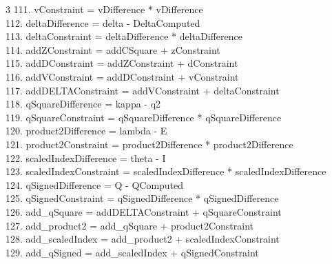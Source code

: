 \documentclass[10pt]{article}
\begin{document}
\begin{multicols}{3}
111. vConstraint = vDifference * vDifference\\
112. deltaDifference = delta - DeltaComputed\\
113. deltaConstraint = deltaDifference * deltaDifference\\
114. addZConstraint = addCSquare + zConstraint\\
115. addDConstraint = addZConstraint + dConstraint\\
116. addVConstraint = addDConstraint + vConstraint\\
117. addDELTAConstraint = addVConstraint + deltaConstraint\\
118. qSquareDifference = kappa - q2\\
119. qSquareConstraint = qSquareDifference * qSquareDifference\\
120. product2Difference = lambda - E\\
121. product2Constraint = product2Difference * product2Difference\\
122. scaledIndexDifference = theta - I\\
123. scaledIndexConstraint = scaledIndexDifference * scaledIndexDifference\\
124. qSignedDifference = Q - QComputed\\
125. qSignedConstraint = qSignedDifference * qSignedDifference\\
126. add\_qSquare = addDELTAConstraint + qSquareConstraint\\
127. add\_product2 = add\_qSquare + product2Constraint\\
128. add\_scaledIndex = add\_product2 + scaledIndexConstraint\\
129. add\_qSigned = add\_scaledIndex + qSignedConstraint\\
\end{multicols}
\end{document}
